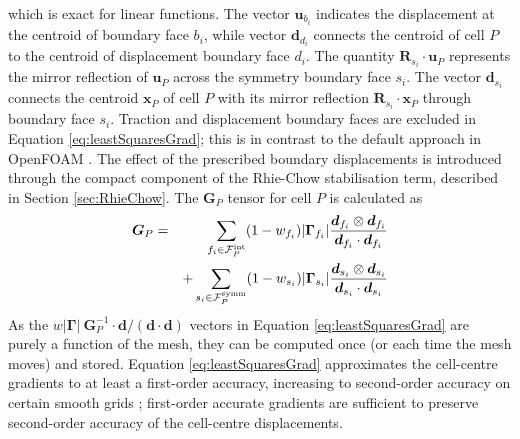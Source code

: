 \documentclass[sn-mathphys,Numbered]{sn-jnl}%
\newcommand{\bb}{\boldsymbol}
\begin{document}
which is exact for linear functions.
The vector $\bb{u}_{b_i}$ indicates the displacement at the centroid of boundary face ${b_i}$, while vector $\bb{d}_{d_i}$ connects the centroid of cell $P$ to the centroid of displacement boundary face $d_i$.
The quantity $\bb{R}_{s_i} \cdot \bb{u}_P$ represents the mirror reflection of $\bb{u}_P$ across the symmetry boundary face $s_i$.
The vector $\bb{d}_{s_i}$ connects the centroid $\bb{x}_P$ of cell $P$ with its mirror reflection $\bb{R}_{s_i}  \cdot \bb{x}_P$ through boundary face $s_i$.
Traction and displacement boundary faces are excluded in Equation \ref{eq:leastSquaresGrad}; this is in contrast to the default approach in OpenFOAM \citep{Jasak2011}.
The effect of the prescribed boundary displacements is introduced through the compact component of the Rhie-Chow stabilisation term, described in Section \ref{sec:RhieChow}.
The $\bb{G}_P$ tensor for cell $P$ is calculated as
\begin{eqnarray}
	 \bb{G}_P &=&
	 \sum_{{f_i} \in \mathcal{F}^{\text{int}}_P} (1 - w_{f_i}) |\bb{\Gamma}_{f_i}|  \frac{\bb{d}_{f_i} \otimes \bb{d}_{f_i}}{\bb{d}_{f_i} \cdot \bb{d}_{f_i}} \notag \\
	 && +  \sum_{{s_i} \in \mathcal{F}^{\text{symm}}_P} (1 - w_{s_i}) |\bb{\Gamma}_{s_i}|  \frac{\bb{d}_{s_i} \otimes \bb{d}_{s_i}}{\bb{d}_{s_i} \cdot \bb{d}_{s_i}}
\end{eqnarray}
As the $w |\bb{\Gamma}| \ \bb{G}^{-1}_P \cdot \bb{d}/(\bb{d}\cdot \bb{d})$ vectors in Equation \ref{eq:leastSquaresGrad} are purely a function of the mesh, they can be computed once (or each time the mesh moves) and stored.
Equation \ref{eq:leastSquaresGrad} approximates the cell-centre gradients to at least a first-order accuracy, increasing to second-order accuracy on certain smooth grids \citep{Syrakos2023};
first-order accurate gradients are sufficient to preserve second-order accuracy of the cell-centre displacements.
\end{document}
